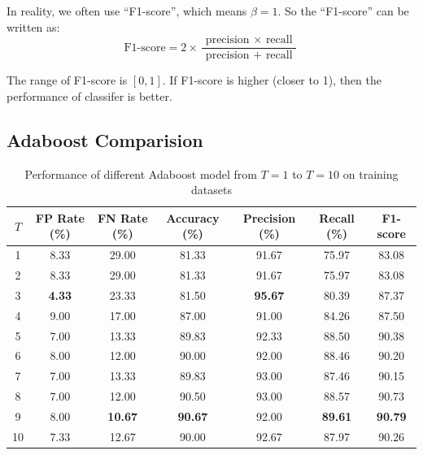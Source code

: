 \documentclass{article}[12pt, twocolumn]
\begin{document}
In reality, we often use ``F1-score'', which means $\beta=1$. So the ``F1-score'' can be written as:
\begin{equation}
    \text {F1-score}=2 \times \frac{\text { precision } \times \text { recall }}{\text { precision }+\text { recall }}
\end{equation}

The range of F1-score is $[0, 1]$. If F1-score is higher (closer to 1), 
then the performance of classifer is better.

\subsection{Adaboost Comparision} \label{subsec:ada_comp}

\begin{table}[H]
    \centering    
    \caption{Performance of different Adaboost model from $T=1$ to $T=10$ on training datasets}
    \begin{tabular}{@{}ccccccc@{}}
        \toprule
        $T$  & FP Rate (\%)  & FN Rate (\%)   & Accuracy (\%)  & Precision (\%)   & Recall (\%)      & F1-score         \\ \midrule
        1  & 8.33          & 29.00          & 81.33          & 91.67        & 75.97        & 83.08        \\
        2  & 8.33          & 29.00          & 81.33          & 91.67        & 75.97        & 83.08        \\
        3  & \textbf{4.33} & 23.33          & 81.50          & \textbf{95.67}        & 80.39        & 87.37        \\
        4  & 9.00          & 17.00          & 87.00          & 91.00        & 84.26        & 87.50        \\
        5  & 7.00          & 13.33          & 89.83          & 92.33        & 88.50        & 90.38        \\
        6  & 8.00          & 12.00 & 90.00          & 92.00        & 88.46        & 90.20        \\
        7  & 7.00          & 13.33          & 89.83          & 93.00 & 87.46        & 90.15        \\
        8  & 7.00          & 12.00 & 90.50          & 93.00        & 88.57        & 90.73        \\
        9  & 8.00          & \textbf{10.67}          & \textbf{90.67} & 92.00        & \textbf{89.61} & \textbf{90.79} \\
        10 & 7.33          & 12.67          & 90.00          & 92.67        & 87.97        & 90.26        \\ \bottomrule
        \end{tabular}
        \label{tab:ada_train}
\end{table}
\end{document}
